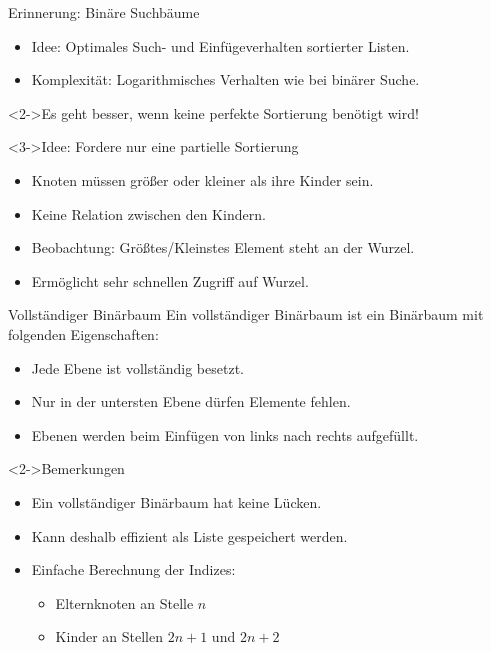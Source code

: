 \begin{frame}
    \begin{block}{Erinnerung: Binäre Suchbäume}
        \begin{itemize}
            \item Idee: Optimales Such- und Einfügeverhalten sortierter Listen.
            \item Komplexität: Logarithmisches Verhalten wie bei binärer Suche.
        \end{itemize}
    \end{block}
    \begin{block}<2->{\alert{Es geht besser, wenn keine perfekte Sortierung benötigt wird!}}
    \end{block}
    \begin{block}<3->{Idee: Fordere nur eine partielle Sortierung}
        \begin{itemize}
            \item Knoten müssen größer oder kleiner als ihre Kinder sein.
            \item Keine Relation zwischen den Kindern.
            \item Beobachtung: Größtes/Kleinstes Element steht an der Wurzel.
            \item Ermöglicht sehr schnellen Zugriff auf Wurzel.
        \end{itemize}
    \end{block}
\end{frame}

\begin{frame}
    \begin{defblock}{Vollständiger Binärbaum}
        Ein vollständiger Binärbaum ist ein Binärbaum mit folgenden Eigenschaften:
        \begin{itemize}
            \item Jede Ebene ist vollständig besetzt.
            \item Nur in der untersten Ebene dürfen Elemente fehlen.
            \item Ebenen werden beim Einfügen von links nach rechts aufgefüllt.
        \end{itemize}
    \end{defblock}
    \begin{block}<2->{Bemerkungen}
        \begin{itemize}
            \item Ein vollständiger Binärbaum hat keine Lücken.
            \item Kann deshalb effizient als Liste gespeichert werden.
            \item Einfache Berechnung der Indizes:
            \begin{itemize}
                \item Elternknoten an Stelle $n$
                \item Kinder an Stellen $2n+1$ und $2n+2$
            \end{itemize}
        \end{itemize}
    \end{block}
\end{frame}

